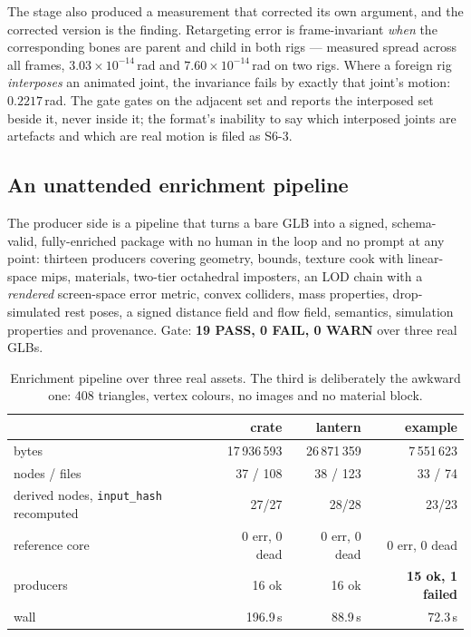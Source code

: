 \documentclass[10pt,twocolumn,letterpaper]{article}
\newcommand{\code}[1]{\texttt{\small #1}}
\begin{document}
The stage also produced a measurement that corrected its own argument, and the
corrected version is the finding. Retargeting error is frame-invariant
\emph{when} the corresponding bones are parent and child in both rigs --- measured
spread across all frames, $3.03\times10^{-14}$\,rad and
$7.60\times10^{-14}$\,rad on two rigs. Where a foreign rig \emph{interposes} an
animated joint, the invariance fails by exactly that joint's motion:
$0.2217$\,rad. The gate gates on the adjacent set and reports the interposed set
beside it, never inside it; the format's inability to say which interposed joints
are artefacts and which are real motion is filed as S6-3.

\subsection{An unattended enrichment pipeline}
\label{sec:pipeline}

The producer side is a pipeline that turns a bare GLB into a signed, schema-valid,
fully-enriched package with no human in the loop and no prompt at any point:
thirteen producers covering geometry, bounds, texture cook with linear-space mips,
materials, two-tier octahedral imposters, an LOD chain with a \emph{rendered}
screen-space error metric, convex colliders, mass properties, drop-simulated rest
poses, a signed distance field and flow field, semantics, simulation properties and
provenance. Gate: \textbf{19 PASS, 0 FAIL, 0 WARN} over three real GLBs.

\begin{table}[t]
\caption{Enrichment pipeline over three real assets. The third is deliberately the
awkward one: 408 triangles, vertex colours, no images and no material block.}
\label{tab:pipeline}
\small
\begin{tabular}{@{}L{2.2cm}rrr@{}}
\toprule
 & crate & lantern & example \\
\midrule
bytes & 17\,936\,593 & 26\,871\,359 & 7\,551\,623 \\
nodes / files & 37 / 108 & 38 / 123 & 33 / 74 \\
derived nodes, \code{input\_hash} recomputed & 27/27 & 28/28 & 23/23 \\
reference core & 0 err, 0 dead & 0 err, 0 dead & 0 err, 0 dead \\
producers & 16 ok & 16 ok & \textbf{15 ok, 1 failed} \\
wall & 196.9\,s & 88.9\,s & 72.3\,s \\
\bottomrule
\end{tabular}
\end{table}
\end{document}
